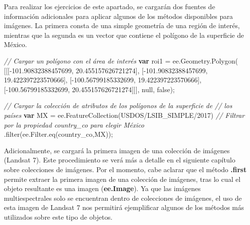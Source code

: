 \documentclass[
  12pt,
  letterpaper,
  twoside]{book}
\newenvironment{Shaded}{\begin{snugshade}}{\end{snugshade}}
\newcommand{\AttributeTok}[1]{\textcolor[rgb]{0.48,0.12,0.64}{#1}}
\newcommand{\CommentTok}[1]{\textcolor[rgb]{0.24,0.58,0.00}{\textit{#1}}}
\newcommand{\ControlFlowTok}[1]{\textcolor[rgb]{0.00,0.00,0.00}{\textbf{#1}}}
\newcommand{\FloatTok}[1]{\textcolor[rgb]{0.28,0.53,0.93}{#1}}
\newcommand{\FunctionTok}[1]{\textcolor[rgb]{0.48,0.12,0.64}{#1}}
\newcommand{\KeywordTok}[1]{\textcolor[rgb]{0.48,0.12,0.64}{#1}}
\newcommand{\NormalTok}[1]{#1}
\newcommand{\OperatorTok}[1]{\textcolor[rgb]{0.00,0.00,0.00}{#1}}
\newcommand{\StringTok}[1]{\textcolor[rgb]{0.87,0.29,0.22}{#1}}
\newcommand\boldpurple[1]{\textcolor{darkpurple}{\textbf{#1}}}
\begin{document}
Para realizar los ejercicios de este apartado, se cargarán dos fuentes de información adicionales para aplicar algunos de los métodos disponibles para imágenes. La primera consta de una simple geometría de una región de interés, mientras que la segunda es un vector que contiene el polígono de la superficie de México.

\begin{Shaded}
\begin{Highlighting}[]
\CommentTok{// Cargar un polígono con el área de interés}
\ControlFlowTok{var}\NormalTok{ roi1 }\OperatorTok{=} \KeywordTok{ee}\OperatorTok{.}\AttributeTok{Geometry}\OperatorTok{.}\FunctionTok{Polygon}\NormalTok{(}
\NormalTok{        [[[}\OperatorTok{{-}}\FloatTok{101.90832388457699}\OperatorTok{,} \FloatTok{20.455157626721274}\NormalTok{]}\OperatorTok{,}
\NormalTok{          [}\OperatorTok{{-}}\FloatTok{101.90832388457699}\OperatorTok{,} \FloatTok{19.422397223570666}\NormalTok{]}\OperatorTok{,}
\NormalTok{          [}\OperatorTok{{-}}\FloatTok{100.56799185332699}\OperatorTok{,} \FloatTok{19.422397223570666}\NormalTok{]}\OperatorTok{,}
\NormalTok{          [}\OperatorTok{{-}}\FloatTok{100.56799185332699}\OperatorTok{,} \FloatTok{20.455157626721274}\NormalTok{]]]}\OperatorTok{,} \KeywordTok{null}\OperatorTok{,} \KeywordTok{false}\NormalTok{)}\OperatorTok{;}

\CommentTok{// Cargar la colección de atributos de los polígonos de la superficie de }
\CommentTok{// los países}
\ControlFlowTok{var}\NormalTok{ MX }\OperatorTok{=} \KeywordTok{ee}\OperatorTok{.}\FunctionTok{FeatureCollection}\NormalTok{(}\StringTok{\textquotesingle{}USDOS/LSIB\_SIMPLE/2017\textquotesingle{}}\NormalTok{)}
  \CommentTok{// Filtrar por la propiedad country\_co para elegir México}
  \OperatorTok{.}\FunctionTok{filter}\NormalTok{(}\KeywordTok{ee}\OperatorTok{.}\AttributeTok{Filter}\OperatorTok{.}\FunctionTok{eq}\NormalTok{(}\StringTok{\textquotesingle{}country\_co\textquotesingle{}}\OperatorTok{,}\StringTok{\textquotesingle{}MX\textquotesingle{}}\NormalTok{))}\OperatorTok{;}
\end{Highlighting}
\end{Shaded}

Adicionalmente, se cargará la primera imagen de una colección de imágenes (Landsat 7). Este procedimiento se verá más a detalle en el siguiente capítulo sobre colecciones de imágenes. Por el momento, cabe aclarar que el método \boldpurple{.first} permite extraer la primera imagen de una colección de imágenes, tras lo cual el objeto resultante es una imagen (\boldpurple{ee.Image}). Ya que las imágenes multiespectrales solo se encuentran dentro de colecciones de imágenes, el uso de esta imagen de Landsat 7 nos permitirá ejemplificar algunos de los métodos más utilizados sobre este tipo de objetos.
\end{document}
